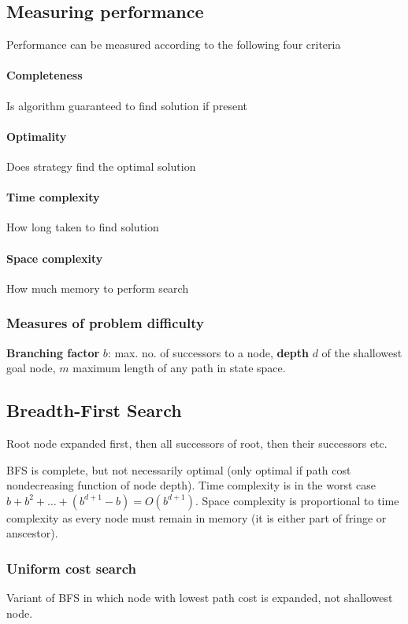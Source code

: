 \begin{multicols}{4}
\subsection{Measuring performance}
Performance can be measured according to the following four criteria
\paragraph{Completeness} Is algorithm guaranteed to find solution if present
\paragraph{Optimality} Does strategy find the optimal solution
\paragraph{Time complexity} How long taken to find solution
\paragraph{Space complexity} How much memory to perform search

\subsubsection{Measures of problem difficulty}
\textbf{Branching factor} $b$: max. no. of successors to a node, \textbf{depth} $d$ of the shallowest goal node, $m$ maximum length of any path in state space.

\subsection{Breadth-First Search}

Root node expanded first, then all successors of root, then their successors etc.

BFS is complete, but not necessarily optimal (only optimal if path cost nondecreasing function of node depth). Time complexity is in the worst case $b + b^2 + \dots + (b^{d+1} - b) = O(b^{d+1})$. Space complexity is proportional to time complexity as every node must remain in memory (it is either part of fringe or anscestor).

\subsubsection{Uniform cost search}

Variant of BFS in which node with lowest path cost is expanded, not shallowest node.


\end{multicols}

